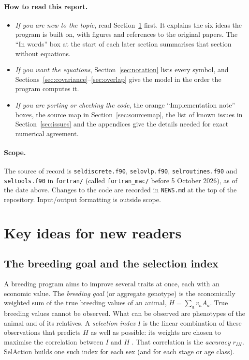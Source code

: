 \documentclass[11pt]{article}
\newcommand{\src}[1]{\texttt{#1}}
\begin{document}
\paragraph{How to read this report.}
\begin{itemize}
\item \emph{If you are new to the topic}, read Section~\ref{sec:background} first. It explains the six ideas the program is built on, with figures and references to the original papers. The ``In words'' box at the start of each later section summarises that section without equations.
\item \emph{If you want the equations}, Section~\ref{sec:notation} lists every symbol, and Sections~\ref{sec:covariance}--\ref{sec:overlap} give the model in the order the program computes it.
\item \emph{If you are porting or checking the code}, the orange ``Implementation note'' boxes, the source map in Section~\ref{sec:sourcemap}, the list of known issues in Section~\ref{sec:issues} and the appendices give the details needed for exact numerical agreement.
\end{itemize}

\paragraph{Scope.} {\sloppy The source of record is \src{seldiscrete.f90}, \src{selovlp.f90}, \src{selroutines.f90} and \src{seltools.f90} in \src{fortran/} (called \src{fortran\_mac/} before 5 October 2026), as of the date above. Changes to the code are recorded in \src{NEWS.md} at the top of the repository. Input/output formatting is outside scope.\par}

\section{Key ideas for new readers}\label{sec:background}

\subsection{The breeding goal and the selection index}
A breeding program aims to improve several traits at once, each with an economic value. The \emph{breeding goal} (or aggregate genotype) is the economically weighted sum of the true breeding values of an animal, $H=\sum_a v_aA_a$. True breeding values cannot be observed. What can be observed are phenotypes of the animal and of its relatives. A \emph{selection index} $I$ is the linear combination of these observations that predicts $H$ as well as possible: its weights are chosen to maximise the correlation between $I$ and $H$ \cite{hazel1943}. That correlation is the \emph{accuracy} $r_{IH}$. SelAction builds one such index for each sex (and for each stage or age class).
\end{document}
